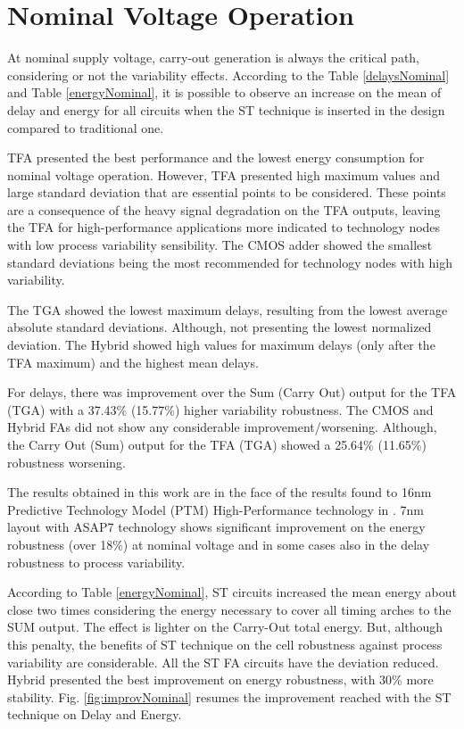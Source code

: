 \documentclass[ecp,tc, english]{iiufrgs}
\begin{document}
\section{Nominal Voltage Operation}

At nominal supply voltage, carry-out generation is always the critical path, considering or not the variability effects. According to the Table \ref{delaysNominal} and Table \ref{energyNominal}, it is possible to observe an increase on the mean of delay and energy for all circuits when the ST technique is inserted in the design compared to traditional one.

TFA presented the best performance and the lowest energy consumption for nominal voltage operation. However, TFA presented high maximum values and large standard deviation that are essential points to be considered. These points are a consequence of the heavy signal degradation on the TFA outputs, leaving the TFA for high-performance applications more indicated to technology nodes with low process variability sensibility. The CMOS adder showed the smallest standard deviations being the most recommended for technology nodes with high variability. 

The TGA showed the lowest maximum delays, resulting from the lowest average absolute standard deviations. Although, not presenting the lowest normalized deviation. The Hybrid showed high values for maximum delays (only after the TFA maximum) and the highest mean delays.   

For delays, there was improvement over the Sum (Carry Out) output for the TFA (TGA) with a 37.43\% (15.77\%) higher variability robustness. The CMOS and Hybrid FAs did not show any considerable improvement/worsening. Although, the Carry Out (Sum) output for the TFA (TGA) showed a 25.64\% (11.65\%) robustness worsening.

The results obtained in this work are in the face of the results found to 16nm Predictive Technology Model (PTM) High-Performance technology \cite{ptm} in \cite{samuel2016}. 7nm layout with ASAP7 technology shows significant improvement on the energy robustness (over 18\%) at nominal voltage and in some cases also in the delay robustness to process variability. 

According to Table \ref{energyNominal}, ST circuits increased the mean energy about close two times considering the energy necessary to cover all timing arches to the SUM output. The effect is lighter on the Carry-Out total energy. But, although this penalty, the benefits of ST technique on the cell robustness against process variability are considerable. All the ST FA circuits have the deviation reduced. Hybrid presented the best improvement on energy robustness, with 30\% more stability. Fig. \ref{fig:improvNominal} resumes the improvement reached with the ST technique on Delay and Energy.
\end{document}
